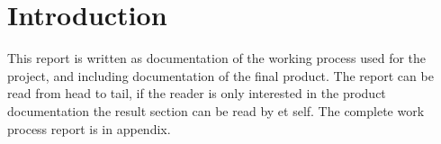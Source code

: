 \chapter{Introduction}
This report is written as documentation of the working process used for the project, and including documentation of the final product. The report can be read from head to tail, if the reader is only interested in the product documentation the result section can be read by et self. The complete work process report is in appendix.
